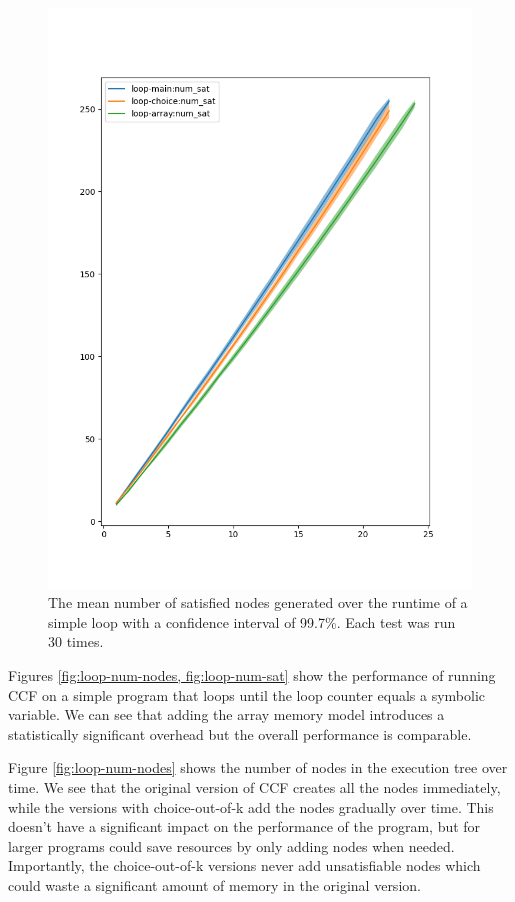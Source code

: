 \documentclass[12pt,twoside]{report}
\begin{document}
\begin{figure}
    \centering
    \includegraphics[scale=0.4]{loop-num-sat.png}
    \caption{The mean number of satisfied nodes generated over the runtime of a simple loop with a confidence interval of 99.7\%. Each test was run 30 times.}
    \label{fig:loop-num-sat}
\end{figure}

Figures \ref{fig:loop-num-nodes, fig:loop-num-sat} show the performance of running CCF on a simple program that loops until the loop counter equals a symbolic variable.
We can see that adding the array memory model introduces a statistically significant overhead but the overall performance is comparable.

Figure \ref{fig:loop-num-nodes} shows the number of nodes in the execution tree over time. We see that the original version of CCF creates all the nodes immediately, while the versions with choice-out-of-k add the nodes gradually over time. This doesn't have a significant impact on the performance of the program, but for larger programs could save resources by only adding nodes when needed. Importantly, the choice-out-of-k versions never add unsatisfiable nodes which could waste a significant amount of memory in the original version.
\end{document}
